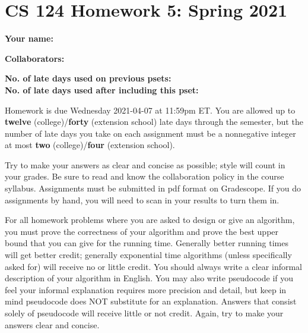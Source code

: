 \documentclass[10pt]{article}
\begin{document}
	
	\section*{CS 124 Homework 5: Spring 2021}
 		
	\textbf{Your name:} 
		
	\textbf{Collaborators:} 

	\textbf{No. of late days used on previous psets: }\\
	\textbf{No. of late days used after including this pset: }

Homework is due Wednesday 2021-04-07 at 11:59pm ET. You are allowed up to {\bf twelve} (college)/{\bf forty} (extension school) late days through the semester, but the number of late days you take on each assignment must be a nonnegative integer at most {\bf two} (college)/{\bf four} (extension school).

Try to make your answers as clear and concise as possible;
style will count in your grades. Be sure to read and know the collaboration policy in the course
syllabus. Assignments must be submitted in pdf format on Gradescope. If you do assignments by hand, you
will need to scan in your results to turn them in. 

For all homework problems where you are asked to design or give an algorithm, you must prove the correctness
of your algorithm and prove the best upper bound that you can give for the running time. Generally
better running times will get better credit; generally exponential time algorithms (unless specifically asked
for) will receive no or little credit. You should always write a clear informal description of your algorithm
in English. You may also write pseudocode if you feel your informal explanation requires more precision
and detail, but keep in mind pseudocode does NOT substitute for an explanation. Answers that consist
solely of pseudocode will receive little or not credit. Again, try to make your answers clear and concise.
\end{document}
